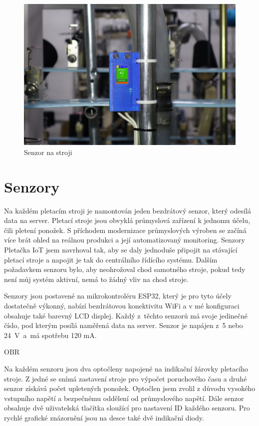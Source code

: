 \documentclass{template/socthesis}
\begin{document}
\begin{figure}[htbp]
    \centering
    \includegraphics[width=\textwidth]{img/V2-uchyceni.png}
    \caption{Senzor na stroji}
    \label{fig:SenzorNaStroji}
\end{figure}


\section{Senzory}

Na každém pletacím stroji je namontován jeden bezdrátový senzor, který odesílá data na server.
Pletací stroje jsou obvyklá průmyslová zařízení k jednomu účelu, čili pletení ponožek.
S příchodem modernizace průmyslových výroben se začíná více brát ohled na reálnou produkci a její automatizovaný monitoring.
Senzory Pletačka IoT jsem navrhoval tak, aby se daly jednoduše připojit na stávající pletací stroje a napojit je tak do centrálního řídícího systému.
Dalším požadavkem senzoru bylo, aby neohrožoval chod samotného stroje, pokud tedy není můj systém aktivní, nemá to žádný vliv na chod stroje.

Senzory jsou postavené na mikrokontroléru ESP32, který je pro tyto účely dostatečně výkonný, nabízí bezdrátovou konektivitu WiFi a v mé konfiguraci obsahuje také barevný LCD displej.
Každý z~těchto senzorů má svoje jedinečné číslo, pod kterým posílá naměřená data na server.
Senzor je napájen z~5 nebo 24~V~a~má spotřebu 120 mA.

OBR

Na každém senzoru jsou dva optočleny napojené na indikační žárovky pletacího stroje.
Z jedné se snímá zastavení stroje pro výpočet poruchového času a druhé senzor získává počet upletených ponožek.
Optočlen jsem zvolil z důvodu vysokého vstupního napětí a bezpečnému oddělení od průmyslového napětí.
Dále senzor obsahuje dvě uživatelská tlačítka sloužící pro nastavení ID každého senzoru.
Pro rychlé grafické znázornění jsou na desce také dvě indikační diody.
\end{document}
